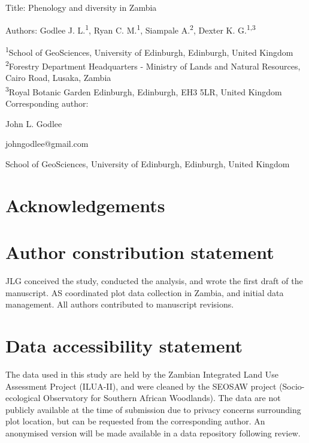 \documentclass[11pt,a4paper]{article}
\newcommand{\titletext}{Phenology and diversity in Zambia}
\begin{document}
{\Large{Title: \titletext{}}}

Authors: Godlee J. L.\textsuperscript{1}, Ryan C. M.\textsuperscript{1}, Siampale A.\textsuperscript{2}, Dexter K. G.\textsuperscript{1,3}

\textsuperscript{1}School of GeoSciences, University of Edinburgh, Edinburgh, United Kingdom \\
\textsuperscript{2}Forestry Department Headquarters - Ministry of Lands and Natural Resources, Cairo Road, Lusaka, Zambia \\
\textsuperscript{3}Royal Botanic Garden Edinburgh, Edinburgh, EH3 5LR, United Kingdom \\

\vspace{1em}
Corresponding author:

John L. Godlee

johngodlee@gmail.com

School of GeoSciences, University of Edinburgh, Edinburgh, United Kingdom

\section*{Acknowledgements}

\section*{Author constribution statement}

JLG conceived the study, conducted the analysis, and wrote the first draft of the manuscript. AS coordinated plot data collection in Zambia, and initial data management. All authors contributed to manuscript revisions.  

\section*{Data accessibility statement}

The data used in this study are held by the Zambian Integrated Land Use Assessment Project (ILUA-II), and were cleaned by the SEOSAW project (Socio-ecological Observatory for Southern African Woodlands). The data are not publicly available at the time of submission due to privacy concerns surrounding plot location, but can be requested from the corresponding author. An anonymised version will be made available in a data repository following review.

\newpage{}
\linenumbers
\end{document}
